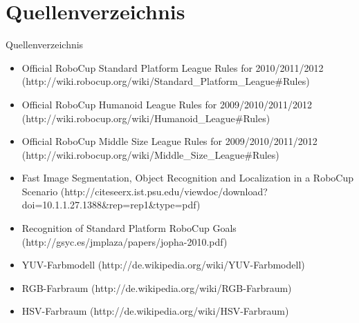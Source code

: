 \documentclass{beamer}
\begin{document}
\section*{Quellenverzeichnis}
\begin{frame}{Quellenverzeichnis}
\begin{tiny}
\begin{itemize}
    \item Official RoboCup Standard Platform League Rules for 2010/2011/2012  (http://wiki.robocup.org/wiki/Standard\_Platform\_League\#Rules)
    \item Official RoboCup Humanoid League Rules for 2009/2010/2011/2012 (http://wiki.robocup.org/wiki/Humanoid\_League\#Rules)
    \item Official RoboCup Middle Size League Rules for 2009/2010/2011/2012 (http://wiki.robocup.org/wiki/Middle\_Size\_League\#Rules)
    \item Fast Image Segmentation, Object Recognition and Localization in a RoboCup Scenario (http://citeseerx.ist.psu.edu/viewdoc/download?doi=10.1.1.27.1388\&rep=rep1\&type=pdf)
    \item Recognition of Standard Platform RoboCup Goals (http://gsyc.es/jmplaza/papers/jopha-2010.pdf)
    \item YUV-Farbmodell (http://de.wikipedia.org/wiki/YUV-Farbmodell)
    \item RGB-Farbraum (http://de.wikipedia.org/wiki/RGB-Farbraum)
    \item HSV-Farbraum (http://de.wikipedia.org/wiki/HSV-Farbraum)
\end{itemize}
\end{tiny}
\end{frame}
\end{document}
